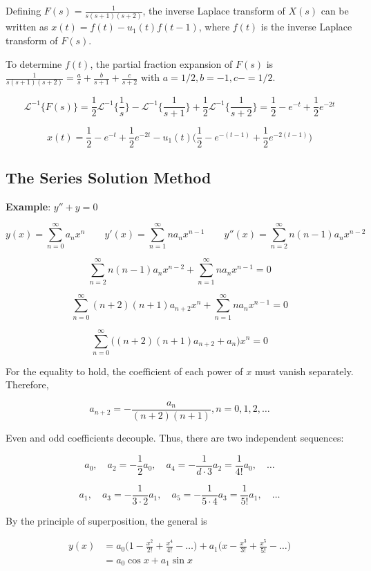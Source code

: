 Defining $F(s) = \frac{1}{s(s+1)(s+2)}$, the inverse Laplace transform of $X(s)$ can be written as $x(t) = f(t) - u_1(t) f(t - 1)$, where $f(t)$ is the inverse Laplace transform of $F(s)$.

To determine $f(t)$, the partial fraction expansion of $F(s)$ is $\frac{1}{s(s+1)(s+2)} = \frac{a}{s} + \frac{b}{s+1} + \frac{c}{s+2}$ with $a = 1 / 2, b = -1, c -= 1 / 2$.

$$\mathcal{L}^{-1}\{ F(s) \} = \frac{1}{2} \mathcal{L}^{-1} \Big\{ \frac{1}{s} \Big\} - \mathcal{L}^{-1} \Big\{ \frac{1}{s+1} \Big\} + \frac{1}{2} \mathcal{L}^{-1} \Big\{ \frac{1}{s+2} \Big\} = \frac{1}{2} - e^{-t} + \frac{1}{2} e^{-2t}$$

$$x(t) = \frac{1}{2} - e^{-t} + \frac{1}{2} e^{-2t} - u_1(t) \Big( \frac{1}{2} - e^{-(t-1)} + \frac{1}{2} e^{-2(t-1)} \Big)$$

\subsection{The Series Solution Method}

\textbf{Example}: $y'' + y = 0$

$$
y(x) = \sum_{n=0}^\infty a_n x^n
\qquad
y'(x) = \sum_{n=1}^\infty n a_n x^{n-1}
\qquad
y''(x) = \sum_{n=2}^\infty n (n-1) a_n x^{n-2}
$$

$$\sum_{n=2}^\infty n (n-1) a_n x^{n-2} + \sum_{n=1}^\infty n a_n x^{n-1} = 0$$

$$\sum_{n=0}^\infty (n+2)(n+1) a_{n+2} x^n + \sum_{n=1}^\infty n a_n x^{n-1} = 0$$

$$\sum_{n=0}^\infty \big( (n+2) (n+1) a_{n+2} + a_n \big) x^n = 0$$

For the equality to hold, the coefficient of each power of $x$ must vanish separately. Therefore,

$$a_{n+2} = - \frac{a_n}{(n+2)(n+1)}, n = 0, 1, 2, \dots$$

Even and odd coefficients decouple. Thus, there are two independent sequences:

$$a_0, \quad a_2 = - \frac{1}{2}a_0, \quad a_4 = - \frac{1}{d \cdot 3} a_2 = \frac{1}{4!} a_0, \quad \dots$$

$$a_1, \quad a_3 = - \frac{1}{3 \cdot 2} a_1, \quad a_5 = - \frac{1}{5 \cdot 4} a_3 = \frac{1}{5!} a_1, \quad \dots$$

By the principle of superposition, the general is

\begin{align*}
    y(x) & = a_0 \Big( 1 - \frac{x^2}{2!} + \frac{x^4}{4!} - \dots \Big) + a_1 \Big( x - \frac{x^3}{3!} + \frac{x^5}{5!} - \dots \Big) \\
    & = a_0 \cos{x} + a_1 \sin{x}
\end{align*}
